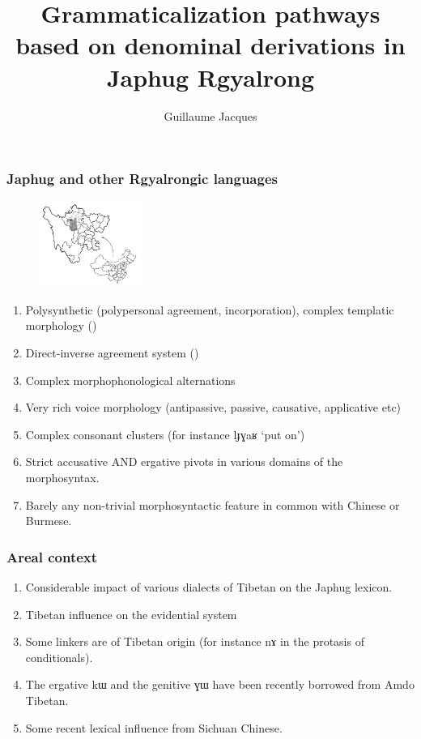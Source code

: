 \documentclass[xcolor=table]{beamer}
\newcommand{\ipa}[1]{{\phon \mbox{#1}}} %
\begin{document}
 \title{Grammaticalization pathways based on denominal derivations in Japhug Rgyalrong}
 \author{Guillaume Jacques}
 \maketitle
 
  \begin{frame} 
 \frametitle{Japhug and other Rgyalrongic languages} 
 \begin{figure}[H]
\centering
\includegraphics[height=28mm]{carte.JPG}
\end{figure}
 
 
 \begin{enumerate}[<+->]
 \item Polysynthetic (polypersonal agreement, incorporation), complex templatic morphology (\citealt{jacques13harmonization})
  \item Direct-inverse agreement system (\citealt{jacques10inverse})
 \item Complex morphophonological alternations
 \item Very rich voice morphology (antipassive, passive, causative, applicative etc)
 \item Complex consonant clusters (for instance \ipa{lɟɣaʁ} `put on')
 \item Strict accusative AND ergative pivots in various domains of the morphosyntax.
 \item Barely any non-trivial morphosyntactic feature in common with Chinese or Burmese.
 \end{enumerate}
  
  \end{frame}   

  \begin{frame} 
 \frametitle{Areal context} 
 \begin{enumerate}[<+->]
 \item Considerable impact of various dialects of Tibetan on the Japhug lexicon.
 \item Tibetan influence on the evidential system
 \item Some linkers are of Tibetan origin (for instance \ipa{nɤ} in the protasis of conditionals).
 \item The ergative \ipa{kɯ} and the genitive \ipa{ɣɯ} have been recently borrowed from Amdo Tibetan.
 \item Some recent lexical influence from Sichuan Chinese.
 \end{enumerate}
  \end{frame}   
\end{document}
